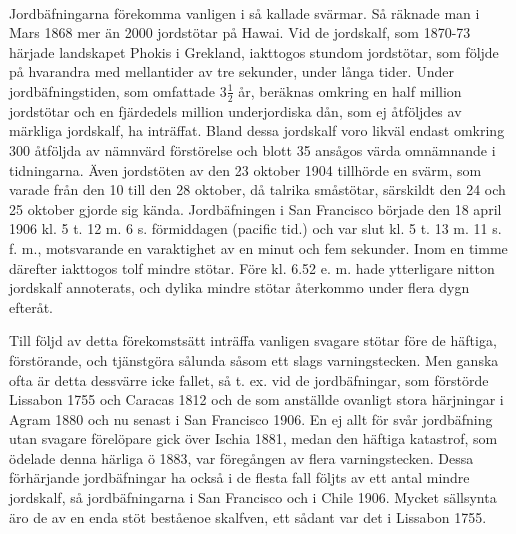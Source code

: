 \documentclass[a4paper, 12pt, oneside, swedish]{article}
\begin{document}
\paragraph{}
Jordbäfningarna förekomma vanligen i så kallade svärmar. Så räknade man i Mars 1868 mer än 2000 jordstötar på Hawai. Vid de jordskalf, som 1870-73 härjade landskapet Phokis i Grekland, iakttogos stundom jordstötar, som följde på hvarandra med mellantider av tre sekunder, under långa tider. Under jordbäfningstiden, som omfattade $3\frac{1}{2}$ år, beräknas omkring en half million jordstötar och en fjärdedels million underjordiska dån, som ej åtföljdes av märkliga jordskalf, ha inträffat. Bland dessa jordskalf voro likväl endast omkring 300 åtföljda av nämnvärd förstörelse och blott 35 ansågos värda omnämnande i tidningarna. Även jordstöten av den 23 oktober 1904 tillhörde en svärm, som varade från den 10 till den 28 oktober, då talrika småstötar, särskildt den 24 och 25 oktober gjorde sig kända. Jordbäfningen i San Francisco började den 18 april 1906 kl. 5 t. 12 m. 6 s. förmiddagen (pacific tid.) och var slut kl. 5 t. 13 m. 11 s. f. m., motsvarande en varaktighet av en minut och fem sekunder. Inom en timme därefter iakttogos tolf mindre stötar. Före kl. 6.52 e. m. hade ytterligare nitton jordskalf annoterats, och dylika mindre stötar återkommo under flera dygn efteråt.

Till följd av detta förekomstsätt inträffa vanligen svagare stötar före de häftiga, förstörande, och tjänstgöra sålunda såsom ett slags varningstecken. Men ganska ofta är detta dessvärre icke fallet, så t. ex. vid de jordbäfningar, som förstörde Lissabon 1755 och Caracas 1812 och de som anställde ovanligt stora härjningar i Agram 1880 och nu senast i San Francisco 1906. En ej allt för svår jordbäfning utan svagare förelöpare gick över Ischia 1881, medan den häftiga katastrof, som ödelade denna härliga ö 1883, var föregången av flera varningstecken. Dessa förhärjande jordbäfningar ha också i de flesta fall följts av ett antal mindre jordskalf, så jordbäfningarna i San Francisco och i Chile 1906. Mycket sällsynta äro de av en enda stöt beståenoe skalfven, ett sådant var det i Lissabon 1755.
\end{document}
